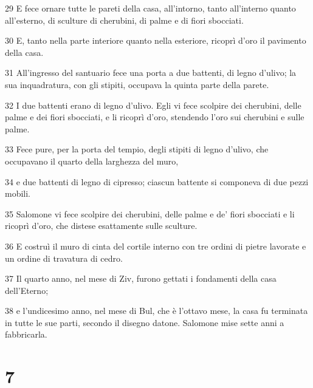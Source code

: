 \par 29 E fece ornare tutte le pareti della casa, all'intorno, tanto all'interno quanto all'esterno, di sculture di cherubini, di palme e di fiori sbocciati.
\par 30 E, tanto nella parte interiore quanto nella esteriore, ricoprì d'oro il pavimento della casa.
\par 31 All'ingresso del santuario fece una porta a due battenti, di legno d'ulivo; la sua inquadratura, con gli stipiti, occupava la quinta parte della parete.
\par 32 I due battenti erano di legno d'ulivo. Egli vi fece scolpire dei cherubini, delle palme e dei fiori sbocciati, e li ricoprì d'oro, stendendo l'oro sui cherubini e sulle palme.
\par 33 Fece pure, per la porta del tempio, degli stipiti di legno d'ulivo, che occupavano il quarto della larghezza del muro,
\par 34 e due battenti di legno di cipresso; ciascun battente si componeva di due pezzi mobili.
\par 35 Salomone vi fece scolpire dei cherubini, delle palme e de' fiori sbocciati e li ricoprì d'oro, che distese esattamente sulle sculture.
\par 36 E costruì il muro di cinta del cortile interno con tre ordini di pietre lavorate e un ordine di travatura di cedro.
\par 37 Il quarto anno, nel mese di Ziv, furono gettati i fondamenti della casa dell'Eterno;
\par 38 e l'undicesimo anno, nel mese di Bul, che è l'ottavo mese, la casa fu terminata in tutte le sue parti, secondo il disegno datone. Salomone mise sette anni a fabbricarla.

\chapter{7}

